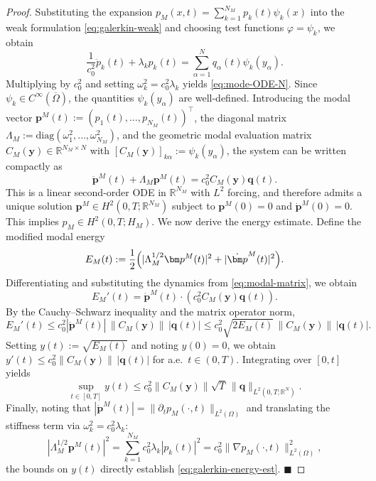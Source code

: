 \documentclass[11pt,a4paper]{article}
\numberwithin{equation}{section}
\begin{document}
\begin{proof}
Substituting the expansion $p_M(x,t)=\sum\limits_{k=1}^{N_M} p_k(t)\psi_k(x)$ into the weak formulation \eqref{eq:galerkin-weak} and choosing test functions $\varphi=\psi_k$, we obtain
\[
\frac{1}{c_0^2}\ddot p_k(t) + \lambda_k p_k(t)
= \sum_{\alpha=1}^N q_\alpha(t)\psi_k(y_\alpha).
\]
Multiplying by $c_0^2$ and setting $\omega_k^2=c_0^2\lambda_k$ yields \eqref{eq:mode-ODE-N}. Since $\psi_k\in C^\infty(\overline{\Omega})$, the quantities $\psi_k(y_\alpha)$ are well-defined. 
\newline
Introducing the modal vector $\bm p^M(t):=(p_1(t),\dots,p_{N_M}(t))^\top$, the diagonal matrix $\Lambda_M:=\mathrm{diag}(\omega_1^2,\dots,\omega_{N_M}^2)$, and the geometric modal evaluation matrix $C_M(\mathbf y)\in\mathbb R^{N_M\times N}$ with $[C_M(\mathbf y)]_{k\alpha}:=\psi_k(y_\alpha)$, the system can be written compactly as
\begin{equation}\label{eq:modal-matrix}
\ddot{\bm p}^M(t)+\Lambda_M\bm p^M(t)=c_0^2 C_M(\mathbf y)\mathbf q(t).
\end{equation}
This is a linear second-order ODE in $\mathbb{R}^{N_M}$ with $L^2$ forcing, and therefore admits a unique solution $\bm p^M\in H^2(0,T;\mathbb{R}^{N_M})$ subject to $\bm p^M(0)=0$ and $\dot{\bm p}^M(0)=0$. This implies $p_M\in H^2(0,T;H_M)$. 
\noindent
We now derive the energy estimate. Define the modified modal energy
\[
E_M(t):=\frac12\Bigl(|\Lambda_M^{1/2}\bm p^M(t)|^2+|\dot{\bm p}^M(t)|^2\Bigr).
\]
Differentiating and substituting the dynamics from \eqref{eq:modal-matrix}, we obtain
\[
E_M'(t)=\dot{\bm p}^M(t)\cdot (c_0^2 C_M(\mathbf y)\mathbf q(t)).
\]
By the Cauchy--Schwarz inequality and the matrix operator norm,
\[
E_M'(t)\le c_0^2 |\dot{\bm p}^M(t)|\,\|C_M(\mathbf y)\|\,|\mathbf q(t)|
\le c_0^2 \sqrt{2E_M(t)}\,\|C_M(\mathbf y)\|\,|\mathbf q(t)|.
\]
Setting $y(t):=\sqrt{E_M(t)}$ and noting $y(0)=0$, we obtain $y'(t)\le c_0^2 \|C_M(\mathbf y)\|\,|\mathbf q(t)|$ for a.e.\ $t\in(0,T)$. Integrating over $[0,t]$ yields
\[
\sup_{t\in[0,T]} y(t) \le c_0^2 \|C_M(\mathbf y)\|\sqrt{T}\,\|\mathbf q\|_{L^2(0,T;\mathbb R^N)}.
\]
Finally, noting that $|\dot{\bm p}^M(t)| = \|\partial_t p_M(\cdot,t)\|_{L^2(\Omega)}$ and translating the stiffness term via $\omega_k^2 = c_0^2\lambda_k$:
\[
|\Lambda_M^{1/2}\bm p^M(t)|^2 = \sum_{k=1}^{N_M} c_0^2\lambda_k |p_k(t)|^2 = c_0^2 \|\nabla p_M(\cdot,t)\|_{L^2(\Omega)}^2,
\]
the bounds on $y(t)$ directly establish \eqref{eq:galerkin-energy-est}. \hfill $\blacksquare$
\end{proof}
\end{document}

